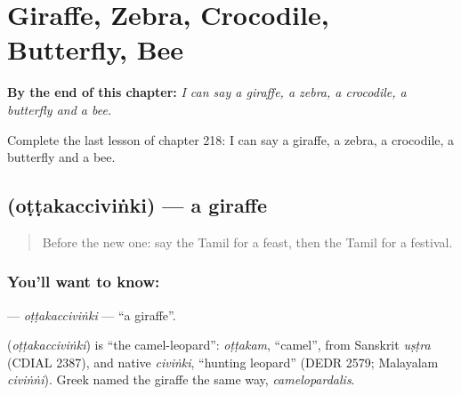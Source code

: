 
\chapter{Giraffe, Zebra, Crocodile, Butterfly, Bee}
\label{ch:ta-giraffe-zebra-crocodile-butterfly-bee}

\begin{chapteropening}
\textbf{By the end of this chapter:} \emph{I can say a giraffe, a zebra, a crocodile, a butterfly and a bee.}

Complete the last lesson of chapter 218: I can say a giraffe, a zebra, a crocodile, a butterfly and a bee.
\end{chapteropening}

\section[\texorpdfstring{\ta{ஒட்டகச்சிவிங்கி} (oṭṭakacciviṅki)}{ஒட்டகச்சிவிங்கி (oṭṭakacciviṅki)}]{ (oṭṭakacciviṅki) — a giraffe}

\label{lesson:TA-C218-ottakaccivinki}



\begin{quote}
Before the new one: say the Tamil for a feast, then the Tamil for a festival.
\end{quote}

\subsection*{You'll want to know: }
\textbf{} — \emph{oṭṭakacciviṅki} — \textquotedblleft{}a giraffe\textquotedblright{}.

\begin{cousinweb}
\textbf{} (\emph{oṭṭakacciviṅki}) is \textquotedblleft{}the camel-leopard\textquotedblright{}: \emph{oṭṭakam}, \textquotedblleft{}camel\textquotedblright{}, from Sanskrit \emph{uṣṭra} (CDIAL 2387), and native \emph{civiṅki}, \textquotedblleft{}hunting leopard\textquotedblright{} (DEDR 2579; Malayalam \emph{civiṅṅi}). Greek named the giraffe the same way, \emph{camelopardalis}.
\end{cousinweb}

